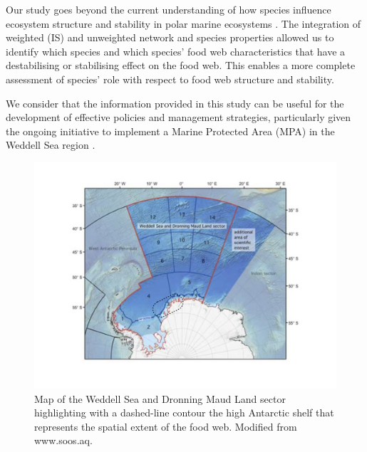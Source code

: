 \documentclass[gc, manuscript]{copernicus}
\begin{document}
\clearpage
\conclusions[Conclusions]

Our study goes beyond the current understanding of how species influence
ecosystem structure and stability in polar marine ecosystems
\citep{Murphy2016, McCormack2021}. The integration of weighted (IS) and
unweighted network and species properties allowed us to identify which
species and which species' food web characteristics that have a
destabilising or stabilising effect on the food web. This enables a more
complete assessment of species' role with respect to food web structure
and stability.

We consider that the information provided in this study can be useful
for the development of effective policies and management strategies,
particularly given the ongoing initiative to implement a Marine
Protected Area (MPA) in the Weddell Sea region \citep{Teschke2021}.

\clearpage

\begin{figure}
\includegraphics[width=12cm]{Fig.1_StudyMap} \caption{Map of the Weddell Sea and Dronning Maud Land sector highlighting with a dashed-line contour the high Antarctic shelf that represents the spatial extent of the food web. Modified from www.soos.aq.}\label{fig:unnamed-chunk-1}
\end{figure}

\clearpage
\end{document}
